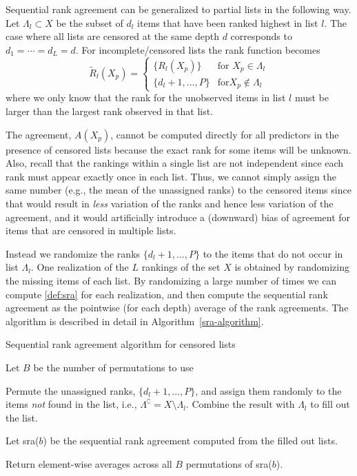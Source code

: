 \documentclass[12pt,a4paper]{article}
\theoremstyle{plain}
\begin{document}
Sequential rank agreement can be generalized to partial lists in the
following way. Let $\Lambda_l\subset X$ be the subset of $d_l$ items
that have been ranked highest in list $l$.  The case where all lists are
censored at the same depth $d$ corresponds to $d_1=\cdots=d_L=d$. For
incomplete/censored lists the rank function becomes
\begin{equation}
	\widetilde R_l(X_p) = \begin{cases}
	     \{R_l(X_p)\} & \text{for } X_p\in \Lambda_l\\
	     \{d_l+1,\dots,P\} & \text{for} X_p \not\in \Lambda_l
        \end{cases}
\end{equation}
where we only know that the rank for the unobserved items in list $l$
must be larger than the largest rank observed in that list.

The agreement, $A(X_p)$, cannot be computed directly for all
predictors in the presence of censored lists because the exact rank
for some items will be unknown. Also, recall that the rankings within
a single list are not independent since each rank must appear exactly
once in each list. Thus, we cannot simply assign the same number
(e.g., the mean of the unassigned ranks) to the censored items since
that would result in \emph{less} variation of the ranks and hence less
variation of the agreement, and it would artificially introduce a
(downward) bias of agreement for items that are censored in multiple
lists.

Instead we randomize the ranks $\{d_{l}+1,\dots,P\}$ to the items that
do not occur in list $\Lambda_l$. One realization of the $L$ rankings
of the set $X$ is obtained by randomizing the missing items of each
list. By randomizing a large number of times we can compute
\eqref{def:sra} for each realization, and then compute the sequential
rank agreement as the pointwise (for each depth) average of the rank
agreements. The algorithm is described in detail in
Algorithm~\ref{sra-algorithm}.

\begin{algorithm}
\caption{Sequential rank agreement algorithm for censored lists}
\label{sra-algorithm}
\begin{algorithmic}[1]
   \State Let $B$ be the number
  of permutations to use  
  \State \parbox[t]{\dimexpr\linewidth-\algorithmicindent-1.7cm}{Permute
    the unassigned ranks, $\{d_l+1, \ldots, P\}$, and assign them
    randomly to the items \emph{not} found in the list, i.e.,
    $\Lambda^\complement=X\setminus\Lambda_l$. Combine the
    result with $\Lambda_l$ to fill out the list.}
\EndFor
\State \parbox[t]{\dimexpr\linewidth-\algorithmicindent-1cm}{Let sra($b$) be the sequential rank agreement computed from the
filled out lists.}
\EndFor
\State Return element-wise averages across all $B$ permutations of sra($b$).
\EndProcedure
\end{algorithmic}
\end{algorithm}
\end{document}
